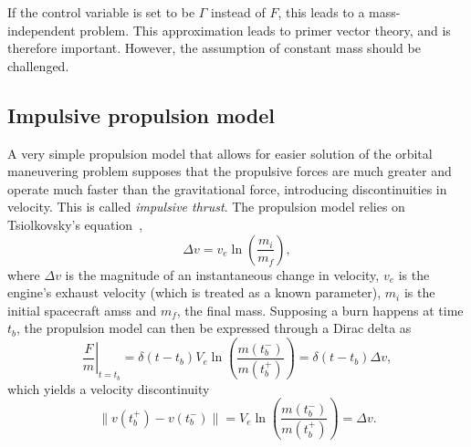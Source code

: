 If the control variable is set to be \(\Gamma\) instead of \(F\), this leads to a mass-independent problem. This approximation leads to primer vector theory, and is therefore important. However, the assumption of constant mass should be challenged.


\subsection{Impulsive propulsion model}


A very simple propulsion model that allows for easier solution of the orbital maneuvering problem supposes that the propulsive forces are much greater and operate much faster than the gravitational force, introducing discontinuities in velocity. This is called \textit{impulsive thrust}. The propulsion model relies on Tsiolkovsky's equation~\cite{Conway_2010}, 
\begin{equation}
    \Delta v = v_e \ln{\left(\frac{m_i}{m_f}\right)},
\end{equation}
where \(\Delta v\) is the magnitude of an instantaneous change in velocity, \(v_e\) is the engine's exhaust velocity (which is treated as a known parameter), \(m_i\) is the initial spacecraft amss and \(m_f\), the final mass. Supposing a burn happens at time \(t_b\), the propulsion model can then be expressed through a Dirac delta as
\begin{equation}
    \left.\frac{F}{m}\right\vert_{t = t_b} = \delta(t - t_b) V_e \ln{\left(\frac{m(t_b^-)}{m(t_b^+)} \right)} = \delta(t - t_b) \Delta v,
\end{equation}
which yields a velocity discontinuity
\begin{equation}
    \lVert v(t_b^+) - v(t_b^-) \rVert = V_e \ln{\left(\frac{m(t_b^-)}{m(t_b^+)}\right)} = \Delta v.
\end{equation}

